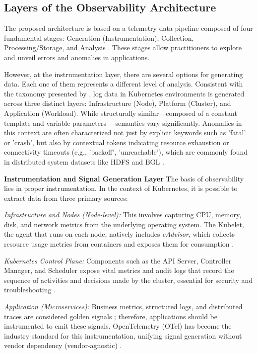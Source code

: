 \subsection{Layers of the Observability Architecture}

The proposed architecture is based on a telemetry data pipeline composed of four fundamental stages: Generation (Instrumentation), Collection, Processing/Storage, and Analysis \cite{kosinska_2023,young_2024}. These stages allow practitioners to explore and unveil errors and anomalies in applications.

However, at the instrumentation layer, there are several options for generating data. Each one of them represents a different level of analysis. Consistent with the taxonomy presented by , log data in Kubernetes environments is generated across three distinct layers: Infrastructure (Node), Platform (Cluster), and Application (Workload). While structurally similar—composed of a constant template and variable parameters \cite{he_2017}—semantics vary significantly. Anomalies in this context are often characterized not just by explicit keywords such as 'fatal' or 'crash', but also by contextual tokens indicating resource exhaustion or connectivity timeouts (e.g., 'backoff', 'unreachable'), which are commonly found in distributed system datasets like HDFS and BGL \cite{du_2017}.

\textbf{Instrumentation and Signal Generation Layer}
The basis of observability lies in proper instrumentation. In the context of Kubernetes, it is possible to extract data from three primary sources:

\textit{Infrastructure and Nodes (Node-level):} This involves capturing CPU, memory, disk, and network metrics from the underlying operating system. The Kubelet, the agent that runs on each node, natively includes \textit{cAdvisor}, which collects resource usage metrics from containers and exposes them for consumption \cite{burns_2019,hausenblas_2023}.

\textit{Kubernetes Control Plane:} Components such as the API Server, Controller Manager, and Scheduler expose vital metrics and audit logs that record the sequence of activities and decisions made by the cluster, essential for security and troubleshooting \cite{creane_2022,muschko_2020}.

\textit{Application (Microservices):} Business metrics, structured logs, and distributed traces are considered golden signals \cite{turnbull_2018}; therefore, applications should be instrumented to emit these signals. OpenTelemetry (OTel) has become the industry standard for this instrumentation, unifying signal generation without vendor dependency (vendor-agnostic) \cite{young_2024,flanders_2024}.